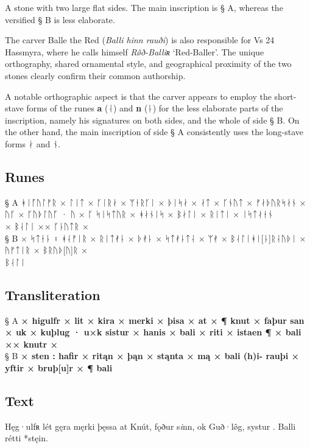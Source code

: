 A stone with two large flat sides.  The main inscription is § A, whereas the versified § B is less elaborate.

The carver Balle the Red (\emph{Balli hinn rauði}) is also responsible for Vs 24 Hassmyra, where he calls himself \emph{Rø̂ð-Balliʀ} ‘Red-Baller’.  The unique orthography, shared ornamental style, and geographical proximity of the two stones clearly confirm their common authorship.

A notable orthographic aspect is that the carver appears to employ the short-stave forms of the runes \textbf{a} (ᛆ) and \textbf{n} (ᚿ) for the less elaborate parts of the inscription, namely his signatures on both sides, and the whole of side § B.  On the other hand, the main inscription of side § A consistently uses the long-stave forms ᛅ and ᚾ.

\subsection{Runes}

§ A ᚼᛁᚵᚢᛚᚠᚱ × ᛚᛁᛏ × ᚴᛁᚱᛅ × ᛘᛂᚱᚴᛁ × ᚦᛁᛋᛅ × ᛅᛏ × ᚴᚾᚢᛏ × ᚠᛅᚦᚢᚱᛋᛅᚾ × ᚢᚴ × ᚴᚢᚦᛚᚢᚵ · ᚢ × ᚴ ᛋᛁᛋᛏᚢᚱ × ᚼᛅᚾᛁᛋ × ᛒᛅᛚᛁ × ᚱᛁᛏᛁ × ᛁᛋᛏᛅᛂᚾ \\
× ᛒᛆᛚᛁ ×× ᚴᚿᚢᛏᚱ × \\
§ B × ᛋᛏᛂᚿ ᛬ ᚼᛆᚠᛁᚱ × ᚱᛁᛏᚯᚿ × ᚦᚯᚿ × ᛋᛏᚯᚿᛏᛆ × ᛘᚯ × ᛒᛆᛚᛁᚼᛁ[ᚿ]ᚱᛆᚢᚦᛁ × ᚤᚠᛏᛁᚱ × ᛒᚱᚢᚦ[ᚢ]ᚱ × \\
ᛒᛆᛚᛁ

\subsection{Transliteration}

§ A \textbf{× higulfr × lit × kira × merki × þisa × at × ¶ knut × faþur san × uk × kuþlug · u×k sistur × hanis × bali × riti × istaen ¶ × bali ×× knutr ×} \\
§ B \textbf{× sten : hafir × ritąn × þąn × stąnta × mą × bali (h)i- rauþi × yftir × bruþ[u]r × ¶ bali}

\subsection{Text}

\bpg\bpa[0]%
\startsub Hęg·ulfʀ lét gęra męrki þęssa at Knút, fǫður s\emph{i}nn, ok Guð·lø̂g,  systur . Balli rétti *stęin.\endsub \\
\epa

